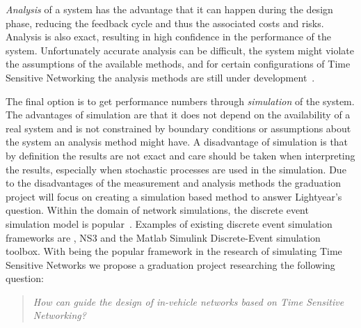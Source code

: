 \textit{Analysis} of a system has the advantage that it can happen during the design phase, reducing the feedback cycle and thus the associated costs and risks. Analysis is also exact, resulting in high confidence in the performance of the system. Unfortunately accurate analysis can be difficult, the system might violate the assumptions of the available methods, and for certain configurations of Time Sensitive Networking the analysis methods are still under development~\cite{ashjaei2021time}. 

The final option is to get performance numbers through \textit{simulation} of the system. The advantages of simulation are that it does not depend on the availability of a real system and is not constrained by boundary conditions or assumptions about the system an analysis method might have. A disadvantage of simulation is that by definition the results are not exact and care should be taken when interpreting the results, especially when stochastic processes are used in the simulation. Due to the disadvantages of the measurement and analysis methods the graduation project will focus on creating a simulation based method to answer Lightyear's question. Within the domain of network simulations, the discrete event simulation model is popular~\cite{ashjaei2021time}. Examples of existing discrete event simulation frameworks are \omnet, NS3 and the Matlab Simulink Discrete-Event simulation toolbox. With \omnet being the popular framework in the research of simulating Time Sensitive Networks we propose a graduation project researching the following question:

\begin{quote}
\emph{How can \omnet guide the design of in-vehicle networks based on Time Sensitive Networking?}
\end{quote}


